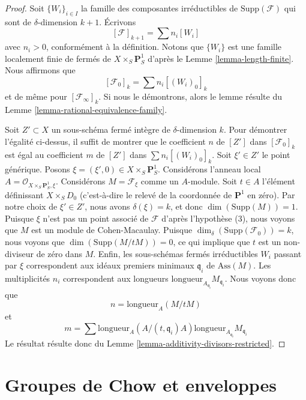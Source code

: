 \begin{proof}
Soit $\{W_i\}_{i \in I}$ la famille des composantes
irréductibles de $\text{Supp}(\mathcal{F})$
qui sont de $\delta$-dimension $k + 1$.
Écrivons
$$
[\mathcal{F}]_{k + 1} = \sum n_i[W_i]
$$
avec $n_i > 0$, conformément à la définition. Notons que $\{W_i\}$
est une famille localement finie de fermés de
$X \times_S \mathbf{P}^1_S$ d'après le Lemme \ref{lemma-length-finite}.
Nous affirmons que
$$
[\mathcal{F}_0]_k = \sum n_i[(W_i)_0]_k
$$
et de même pour $[\mathcal{F}_\infty]_k$. Si nous le démontrons, alors le lemme
résulte du Lemme \ref{lemma-rational-equivalence-family}.

\medskip\noindent
Soit $Z' \subset X$ un sous-schéma fermé intègre de $\delta$-dimension $k$.
Pour démontrer l'égalité ci-dessus, il suffit de montrer que le coefficient $n$
de $[Z']$ dans $[\mathcal{F}_0]_k$ est égal au coefficient $m$ de
$[Z']$ dans $\sum n_i[(W_i)_0]_k$. Soit $\xi' \in Z'$ le point générique.
Posons $\xi = (\xi', 0) \in  X \times_S \mathbf{P}^1_S$.
Considérons l'anneau local $A = \mathcal{O}_{X \times_S \mathbf{P}^1_S, \xi}$.
Considérons $M = \mathcal{F}_\xi$ comme un $A$-module.
Soit $t \in A$ l'élément définissant $X \times_S D_0$
(c'est-à-dire le relevé de la coordonnée de $\mathbf{P}^1$ en zéro).
Par notre choix de $\xi' \in Z'$, nous avons $\delta(\xi) = k$,
et donc $\dim(\text{Supp}(M)) = 1$. Puisque $\xi$ n'est pas un point associé
de $\mathcal{F}$ d'après l'hypothèse (3), nous voyons que $M$ est un module de Cohen-Macaulay.
Puisque $\dim_\delta(\text{Supp}(\mathcal{F}_0)) = k$,
nous voyons que $\dim(\text{Supp}(M/tM)) = 0$, ce qui implique que $t$
est un non-diviseur de zéro dans $M$. Enfin, les sous-schémas fermés irréductibles
$W_i$ passant par $\xi$ correspondent aux idéaux premiers minimaux
$\mathfrak q_i$ de $\text{Ass}(M)$. Les multiplicités $n_i$ correspondent
aux longueurs $\text{longueur}_{A_{\mathfrak q_i}}M_{\mathfrak q_i}$.
Nous voyons donc que
$$
n = \text{longueur}_A(M/tM)
$$
et
$$
m = \sum
\text{longueur}_A(A/(t, \mathfrak q_i)A)
\text{longueur}_{A_{\mathfrak q_i}}M_{\mathfrak q_i}
$$
Le résultat résulte donc du
Lemme \ref{lemma-additivity-divisors-restricted}.
\end{proof}







\section{Groupes de Chow et enveloppes}
\label{section-envelopes}

